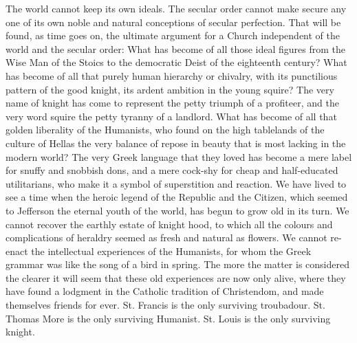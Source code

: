 \documentclass{book}
\begin{document}
The world cannot keep its own ideals. The secular order cannot make secure any one of its own noble and natural conceptions of secular perfection. That will be found, as time goes on, the ultimate argument for a Church independent of the world and the secular order: What has become of all those ideal figures from the Wise Man of the Stoics to the democratic Deist of the eighteenth century? What has become of all that purely human hierarchy or chivalry, with its punctilious pattern of the good knight, its ardent ambition in the young squire? The very name of knight has come to represent the petty triumph of a profiteer, and the very word squire the petty tyranny of a landlord. What has become of all that golden liberality of the Humanists, who found on the high tablelands of the culture of Hellas the very balance of repose in beauty that is most lacking in the modern world? The very Greek language that they loved has become a mere label for snuffy and snobbish dons, and a mere cock-shy for cheap and half-educated utilitarians, who make it a symbol of superstition and reaction. We have lived to see a time when the heroic legend of the Republic and the Citizen, which seemed to Jefferson the eternal youth of the world, has begun to grow old in its turn. We cannot recover the earthly estate of knight hood, to which all the colours and complications of heraldry seemed as fresh and natural as flowers. We cannot re-enact the intellectual experiences of the Humanists, for whom the Greek grammar was like the song of a bird in spring. The more the matter is considered the clearer it will seem that these old experiences are now only alive, where they have found a lodgment in the Catholic tradition of Christendom, and made themselves friends for ever. St. Francis is the only surviving troubadour. St. Thomas More is the only surviving Humanist. St. Louis is the only surviving knight.
\end{document}
